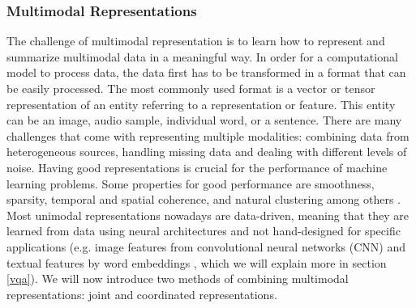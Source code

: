 \documentclass{article}
\begin{document}
\subsubsection{Multimodal Representations}

The challenge of multimodal representation is to learn how to represent and summarize multimodal data in a meaningful way. In order for a computational model to process data, the data first has to be transformed in a format that can be easily processed. The most commonly used format is a vector or tensor representation of an entity referring to a representation or feature. This entity can be an image, audio sample, individual word, or a sentence. There are many challenges that come with representing multiple modalities: combining data from heterogeneous sources, handling missing data and dealing with different levels of noise. Having good representations is crucial for the performance of machine learning problems. Some properties for good performance are smoothness, sparsity, temporal and spatial coherence, and natural clustering among others \citep{bengio2013represent}. Most unimodal representations nowadays are data-driven, meaning that they are learned from data using neural architectures and not hand-designed for specific applications (e.g. image features from convolutional neural networks (CNN) \citep{krizhevsky2012imagenet} and textual features by word embeddings \citep{mikolov2013distri}, which we will explain more in section \ref{vqa}). We will now introduce two methods of combining multimodal representations: joint and coordinated representations.
\end{document}
